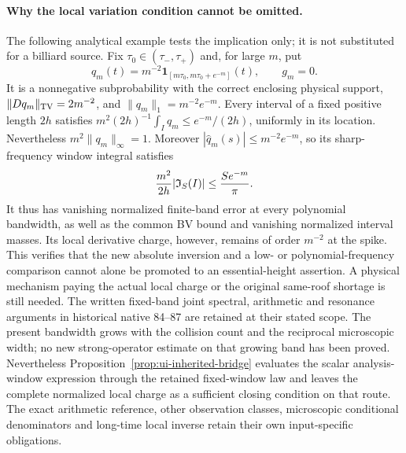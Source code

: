 \paragraph{Why the local variation condition cannot be omitted.}
The following analytical example tests the implication only; it is
not substituted for a billiard source.  Fix $\tau_0\in(\tau_-,\tau_+)$
and, for large $m$, put
\[
 q_m(t)=m^{-2}\mathbf1_{[m\tau_0,m\tau_0+e^{-m}]}(t),\qquad g_m=0.
\]
It is a nonnegative subprobability with the correct enclosing
physical support, $\|Dq_m\|_{\rm TV}=2m^{-2}$, and
$\|q_m\|_1=m^{-2}e^{-m}$.  Every interval of a fixed positive
length $2h$ satisfies
$m^2(2h)^{-1}\int_Iq_m\le e^{-m}/(2h)$, uniformly in its location.
Nevertheless $m^2\|q_m\|_\infty=1$.  Moreover
$|\widehat q_m(s)|\le m^{-2}e^{-m}$, so its sharp-frequency
window integral satisfies
\[
 {m^2\over2h}|\mathfrak I_S(I)|
       \le {S e^{-m}\over\pi}.
\]
It thus has vanishing normalized finite-band error at every
polynomial bandwidth, as well as the common BV bound and vanishing
normalized interval masses.  Its local derivative charge, however,
remains of order $m^{-2}$ at the spike.  This verifies that the new
absolute inversion and a low- or polynomial-frequency comparison
cannot alone be promoted to an essential-height assertion.  A
physical mechanism paying the actual local charge or the original
same-roof shortage is still needed.  The written fixed-band joint
spectral, arithmetic and resonance arguments in historical native
84--87 are retained at their stated scope.  The present bandwidth
grows with the collision count and the reciprocal microscopic width;
no new strong-operator estimate on that growing band has been proved.
Nevertheless Proposition~\ref{prop:ui-inherited-bridge} evaluates
the scalar analysis-window expression through the retained
fixed-window law and leaves the complete normalized local charge
as a sufficient closing condition on that route. The exact
arithmetic reference, other observation classes, microscopic
conditional denominators and long-time local inverse retain their
own input-specific obligations.
